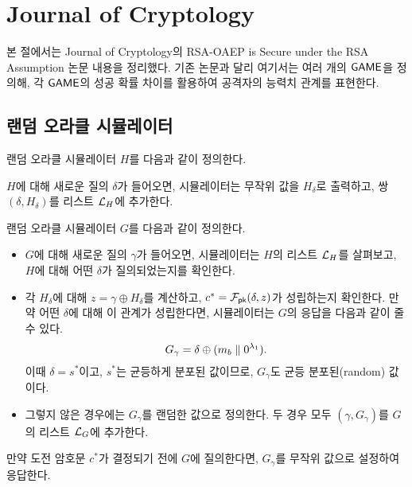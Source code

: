 \section{Journal of Cryptology}

본 절에서는 Journal of Cryptology의 RSA-OAEP is Secure under the RSA Assumption
논문 내용을 정리했다. 기존 논문과 달리 여기서는 여러 개의 $\textsf{GAME}$을 정의해, 각
$\textsf{GAME}$의 성공 확률 차이를 활용하여 공격자의 능력치 관계를 표현한다.


\subsection{랜덤 오라클 시뮬레이터}

랜덤 오라클 시뮬레이터 $H$를 다음과 같이 정의한다.

\begin{tcolorbox}
	$H$에 대해 새로운 질의 $\delta$가 들어오면, 시뮬레이터는 무작위 값을 $H_\delta$로
	출력하고, 쌍 $(\delta, H_\delta)$를 리스트 $\mathcal{L}_H$에 추가한다.
\end{tcolorbox}

랜덤 오라클 시뮬레이터 $G$를 다음과 같이 정의한다.

\begin{tcolorbox}
	\begin{itemize}
		\item $G$에 대해 새로운 질의 $\gamma$가 들어오면, 시뮬레이터는 $H$의
		리스트 $\mathcal{L}_H$를 살펴보고, $H$에 대해 어떤 $\delta$가 질의되었는지를
		확인한다. 
		\item 각 $H_\delta$에 대해 $z = \gamma \oplus H_\delta$를 계산하고, $c^*
		= \mathcal{F}_{\textsf{pk}}(\delta, z)$가 성립하는지 확인한다. 만약 어떤 $\delta$에 대해
		이 관계가 성립한다면, 시뮬레이터는 $G$의 응답을 다음과 같이 줄 수 있다. 
		$$
			G_\gamma = \delta \oplus (m_b \parallel 0^{\lambda_1}).
		$$
		이때 $\delta = s^*$이고, $s^*$는 균등하게 분포된 값이므로, $G_\gamma$도
		균등 분포된(random) 값이다. 
		\item 그렇지 않은 경우에는 $G_\gamma$를 랜덤한 값으로 정의한다. 두 경우
		모두 $(\gamma, G_\gamma)$를 $G$의 리스트 $\mathcal{L}_G$에 추가한다.
	\end{itemize}
\end{tcolorbox}

\begin{memo}
	만약 도전 암호문 $c^*$가 결정되기 전에 $G$에 질의한다면, $G_{\gamma}$를
	무작위 값으로 설정하여 응답한다.
\end{memo}

